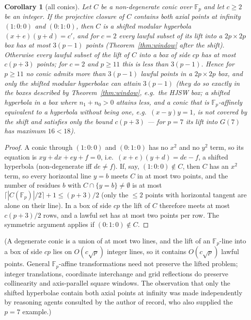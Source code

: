 \documentclass[11pt]{article}
\newtheorem{corollary}[theorem]{Corollary}
\theoremstyle{remark}
\newcommand{\Fp}{\mathbb{F}_p}
\begin{document}
\begin{corollary}[all conics]\label{cor:conics}
Let $C$ be a non-degenerate conic over $\Fp$ and let $c\ge2$ be an integer.  If the projective closure of $C$ contains both axial points at infinity
$(1{:}0{:}0)$ and $(0{:}1{:}0)$, then $C$ is a shifted modular hyperbola $(x+e)(y+d)=c'$, and for $c=2$ every lawful subset of its
lift into a $2p\times2p$ box has at most $3(p-1)$ points (Theorem~\ref{thm:window} after the shift).  Otherwise every lawful subset
of the lift of $C$ into a box of side $cp$ has at most $c(p+3)$ points; for $c=2$ and $p\ge11$ this is less than $3(p-1)$.  Hence
for $p\ge11$ no conic admits more than $3(p-1)$ lawful points in a $2p\times2p$ box, and only the shifted modular hyperbolae can
attain $3(p-1)$ (they do so exactly in the boxes described by Theorem~\ref{thm:window}, e.g.\ the HJSW box; a shifted hyperbola in
a box where $n_1+n_0>0$ attains less, and a conic that is $\Fp$-affinely equivalent to a hyperbola without being one, e.g.\
$(x-y)y=1$, is not covered by the shift and satisfies only the bound $c(p+3)$ --- for $p=7$ its lift into $G(7)$ has maximum $16<18$).
\end{corollary}
\begin{proof}
A conic through $(1{:}0{:}0)$ and $(0{:}1{:}0)$ has no $x^2$ and no $y^2$ term, so its equation is $xy+dx+ey+f=0$, i.e.\
$(x+e)(y+d)=de-f$, a shifted hyperbola (non-degenerate iff $de\ne f$).  If, say, $(1{:}0{:}0)\notin C$, then $C$ has an $x^2$ term,
so every horizontal line $y=b$ meets $C$ in at most two points, and the number of residues $b$ with $C\cap\{y=b\}\ne\emptyset$ is
at most $\lceil|C(\Fp)|/2\rceil+1\le(p+3)/2$ (only the $\le2$ points with horizontal tangent are alone on their line).  In a box of
side $cp$ the lift of $C$ therefore meets at most $c(p+3)/2$ rows, and a lawful set has at most two points per row.  The
symmetric argument applies if $(0{:}1{:}0)\notin C$.
\end{proof}
(A degenerate conic is a union of at most two lines, and the lift of an $\Fp$-line into a box of side $cp$ lies on $O(c\sqrt p)$
integer lines, so it contains $O(c\sqrt p)$ lawful points.  General $\Fp$-affine transformations need not preserve the
lifted problem; integer translations, coordinate interchange and grid reflections do preserve collinearity and axis-parallel square windows.  The observation that only the shifted hyperbolae contain both axial
points at infinity was made independently by reasoning agents consulted by the author of record, who also supplied the $p=7$
example.)
\end{document}
